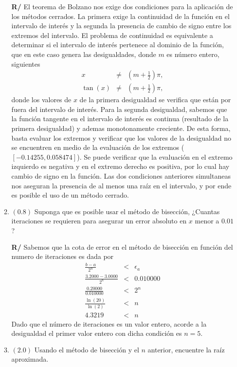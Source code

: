 \documentclass[12pt]{article}
\begin{document}
\begin{enumerate}[leftmargin=*,widest=9]
\begin{enumerate}[label=\alph*]
\textbf{R/} El teorema de Bolzano nos exige dos condiciones para la aplicación de los métodos cerrados. La primera exige la continuidad de la función en el intervalo de interés y la segunda la presencia de cambio de signo entre los extremos del intervalo.
El problema de continuidad es equivalente a determinar si el intervalo de interés pertenece al dominio de la función, que en este caso genera las desigualdades, donde \(m\) es número entero, siguientes
\begin{eqnarray*}
x & \neq & \left(m + \frac{1}{2} \right) \pi, \\
\tan(x) & \neq & \left(m + \frac{1}{2} \right) \pi,
\end{eqnarray*}
donde los valores de \(x\) de la primera desigualdad se verifica que están por fuera del intervalo de interés. Para la segunda desigualdad, sabemos que la función tangente en el intervalo de interés es continua (resultado de la primera desigualdad) y ademas monotonamente creciente. De esta forma, basta evaluar los extremos y verificar que los valores de la desigualdad no se encuentren en medio de la evaluación de los extremos (\([-0.14255, 0.058474]\)).
Se puede verificar que la evaluación en el extremo izquierdo es negativa y en el extremo derecho es positiva, por lo cual hay cambio de signo en la función.
Las dos condiciones anteriores simultaneas nos aseguran la presencia de al menos una raíz en el intervalo, y por ende es posible el uso de un método cerrado.
   \item \((0.8)\) Suponga que es posible usar el método de bisección, ¿Cuantas iteraciones se requieren para asegurar un error absoluto en \(x\) menor a \(0.01\) ?

\textbf{R/} Sabemos que la cota de error en el método de bisección en función del numero de iteraciones es dada por 
   \begin{eqnarray*}
   \frac{b - a}{2^n} &<& \epsilon_a \\
   \frac{3.2000 - 3.0000}{2^n} &<& 0.010000 \\
   \frac{0.20000}{0.010000} &<& 2^n \\
   \frac{\ln(20)}{\ln(2)} &<& n \\
   4.3219 &<& n
   \end{eqnarray*}
   Dado que el número de iteraciones es un valor entero, acorde a la desigualdad el primer valor entero con dicha condición es \(n=5\).
   \item \((2.0)\) Usando el método de bisección y el \(n\) anterior, encuentre la raíz aproximada.


\end{enumerate}
\end{enumerate}
\end{document}
